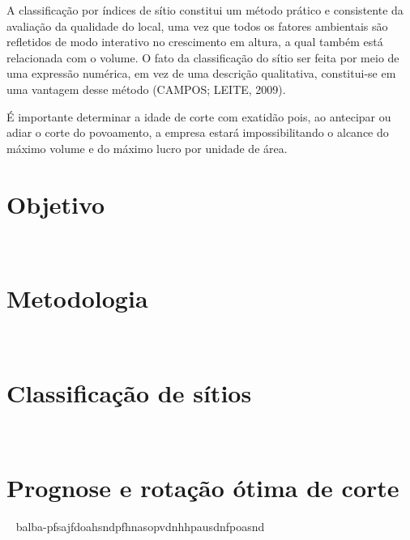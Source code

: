 \documentclass[
  letterpaper,
  DIV=11,
  numbers=noendperiod]{scrartcl}
\begin{document}
A classificação por índices de sítio constitui um método prático e
consistente da avaliação da qualidade do local, uma vez que todos os
fatores ambientais são refletidos de modo interativo no crescimento em
altura, a qual também está relacionada com o volume. O fato da
classificação do sítio ser feita por meio de uma expressão numérica, em
vez de uma descrição qualitativa, constitui-se em uma vantagem desse
método (CAMPOS; LEITE, 2009).

É importante determinar a idade de corte com exatidão pois, ao antecipar
ou adiar o corte do povoamento, a empresa estará impossibilitando o
alcance do máximo volume e do máximo lucro por unidade de área.

\hypertarget{objetivo}{%
\section{Objetivo}\label{objetivo}}

~

\newpage

\hypertarget{metodologia}{%
\section{Metodologia}\label{metodologia}}

~

\hypertarget{classificauxe7uxe3o-de-suxedtios}{%
\section{Classificação de
sítios}\label{classificauxe7uxe3o-de-suxedtios}}

~

\hypertarget{prognose-e-rotauxe7uxe3o-uxf3tima-de-corte}{%
\section{Prognose e rotação ótima de
corte}\label{prognose-e-rotauxe7uxe3o-uxf3tima-de-corte}}

~ balba-pfsajfdoahsndpfhnasopvdnhhpausdnfpoasnd
\end{document}
